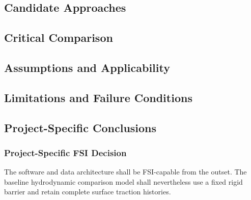 \subsection{Candidate Approaches}
\label{sec:res-str-fsi-candidate-approaches}


\subsection{Critical Comparison}
\label{sec:res-str-fsi-critical-comparison}


\subsection{Assumptions and Applicability}
\label{sec:res-str-fsi-assumptions}


\subsection{Limitations and Failure Conditions}
\label{sec:res-str-fsi-limitations}


\subsection{Project-Specific Conclusions}
\label{sec:res-str-fsi-conclusions}


\subsubsection{Project-Specific FSI Decision}
\label{sec:res-str-fsi-project-decision}

The software and data architecture shall be FSI-capable from the
outset. The baseline hydrodynamic comparison model shall nevertheless use a fixed
rigid barrier and retain complete surface traction histories.

